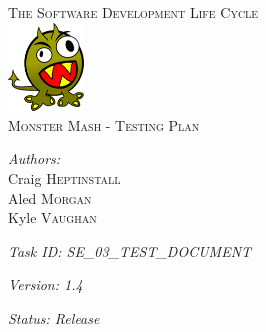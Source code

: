 \documentclass[a4paper]{article}
\begin{document}
\pagestyle{fancy}
\begin{center}
\textsc{\LARGE The Software Development Life Cycle}\\[1.5cm]\includegraphics[width=0.15\textwidth]{img/monster.png}\\[1.5cm] %
\textsc{\Large Monster Mash - Testing Plan }\\[0.5cm] %

\begin{minipage}{0.8\textwidth}
\begin{flushleft} \large
\emph{Authors:}\\
Craig \textsc{Heptinstall}\\
Aled \textsc{Morgan}\\
Kyle \textsc{Vaughan}\\
\end{flushleft}
\end{minipage}
\vspace{8 mm}

\begin{minipage}{0.8\textwidth}
\begin{flushleft} \large
\emph{Task ID: SE\_03\_TEST\_DOCUMENT}
\end{flushleft}
\end{minipage}
\vspace{8 mm}

\begin{minipage}{0.8\textwidth}
\begin{flushleft} \large
\emph{Version: 1.4}
\end{flushleft}
\end{minipage}
\vspace{8 mm}

\begin{minipage}{0.8\textwidth}
\begin{flushleft} \large
\emph{Status: Release}
\end{flushleft}
\end{minipage}
\vspace{8 mm}


\end{center}
\end{document}
